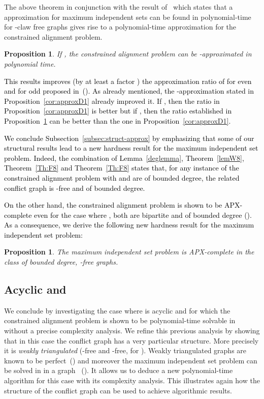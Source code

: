 \documentclass[final]{dmtcs-episciences}
\newtheorem{proposition}[theorem]{Proposition}
\newcommand\mar[1]{\textcolor{black}{#1}}
\begin{document}
The above theorem in conjunction with the result of~\citet{Berman00} which states 
that a  approximation for maximum independent sets can be found 
in polynomial-time for -claw free graphs gives rise to 
a polynomial-time approximation for the constrained alignment problem. 

\begin{proposition}  
If , the constrained alignment problem can be -approximated in polynomial time.
\label{cor16}
\end{proposition}

\mar{This results improves (by at least a factor ) the approximation ratio of 
for even  and  for odd 
 proposed in~(\citet{Fertin200990}). As already mentioned, the -approximation stated in Proposition~\ref{cor:approxD1} already improved it. If , then the ratio in Proposition~\ref{cor:approxD1} is better but if , then the ratio established in  Proposition~\ref{cor16} can be better than the one in Proposition~\ref{cor:approxD1}.}

\mar{We conclude Subsection~\ref{subsec:struct-approx} by emphasizing that some of our structural results lead to a new hardness result for the maximum independent set problem.  Indeed, the combination of Lemma~\ref{deglemma}, Theorem~\ref{lemW8}, Theorem~\ref{Th:F8} and Theorem~\ref{Th:F8} states that, for any instance of the constrained alignment problem with  and  are of bounded degree, the related conflict graph is 
-free and of bounded degree.}

\mar{On the other hand,  the constrained alignment problem is shown to be APX-complete  even for the case where
, both  are bipartite and of  bounded degree (\citet{Fertin200990}).  As a consequence, we derive the following new hardness result for the maximum independent set problem:}

\begin{proposition}
The maximum independent set problem is APX-complete in the class of bounded degree, -free graphs. 
\end{proposition}



\subsection{Acyclic  and }\label{subsec:acyclic}

We conclude by investigating the case where   is acyclic and   for which the constrained alignment
problem is shown to be polynomial-time solvable in~\citet{AbakaBE13} without a precise complexity analysis. We refine this previous analysis by showing that in this case the conflict graph has a very particular structure. More precisely it is {\em weakly triangulated} (-free and -free, for ). Weakly triangulated graphs are known to be perfect~(\citet{hayward}) and moreover the maximum independent set problem can be solved in  in a graph ~(\citet{hayward2}). It allows us to deduce a new polynomial-time algorithm for this case with its complexity analysis. This illustrates again how the structure of the conflict graph can be used to achieve algorithmic results. 
\end{document}
